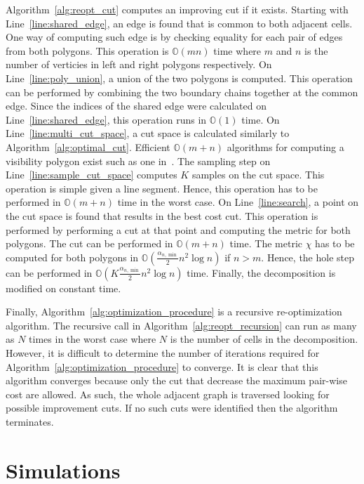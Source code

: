 \documentclass[../main.tex]{subfiles}
\begin{document}
Algorithm~\ref{alg:reopt_cut} computes an improving cut if it exists. Starting with Line~\ref{line:shared_edge}, an edge is found that is common to both adjacent cells. One way of computing such edge is by checking equality for each pair of edges from both polygons. This operation is $\mathbb{O}(mn)$ time where $m$ and $n$ is the number of verticies in left and right polygons respectively. On Line~\ref{line:poly_union}, a union of the two polygons is computed. This operation can be performed by combining the two boundary chains together at the common edge. Since the indices of the shared edge were calculated on Line~\ref{line:shared_edge}, this operation runs in $\mathbb{O}(1)$ time. On Line~\ref{line:multi_cut_space}, a cut space is calculated similarly to Algorithm~\ref{alg:optimal_cut}. Efficient $\mathbb{O}(m+n)$ algorithms for computing a visibility polygon exist such as one in~\cite{el1981linear}. The sampling step on Line~\ref{line:sample_cut_space} computes $K$ samples on the cut space. This operation is simple given a line segment. Hence, this operation has to be performed in $\mathbb{O}(m+n)$ time in the worst case. On Line~\ref{line:search}, a point on the cut space is found that results in the best cost cut. This operation is performed by performing a cut at that point and computing the metric for both polygons. The cut can be performed in $\mathbb{O}(m+n)$ time. The metric $\chi$ has to be computed for both polygons in $\mathbb{O}(\frac{\alpha_{n,\min}}{2}n^2\log{n})$ if $n>m$. Hence, the hole step can be performed in $\mathbb{O}(K\frac{\alpha_{n,\min}}{2}n^2\log{n})$ time. Finally, the decomposition is modified on constant time. 

Finally, Algorithm~\ref{alg:optimization_procedure} is a recursive re-optimization algorithm. The recursive call in Algorithm~\ref{alg:reopt_recursion} can run as many as $N$ times in the worst case where $N$ is the number of cells in the decomposition. However, it is difficult to determine the number of iterations required for Algorithm~\ref{alg:optimization_procedure} to converge. It is clear that this algorithm converges because only the cut that decrease the maximum pair-wise cost are allowed. As such, the whole adjacent graph is traversed looking for possible improvement cuts. If no such cuts were identified then the algorithm terminates.


\section{Simulations}
\label{section:multi_simulations}
\end{document}
